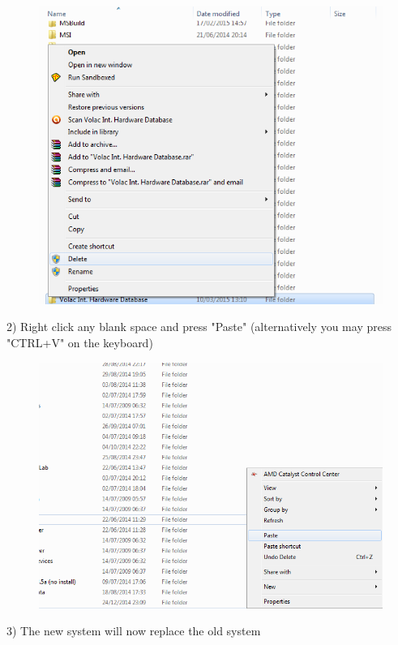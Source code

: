 \begin{figure}[H]
    \includegraphics[width=\textwidth]{./Manual/Images/restore1delete.png}
\end{figure}

2) Right click any blank space and press "Paste" (alternatively you may press "CTRL+V" on the keyboard)

\begin{figure}[H]
    \includegraphics[width=\textwidth]{./Manual/Images/restore1delete2.png}
\end{figure}

3) The new system will now replace the old system

